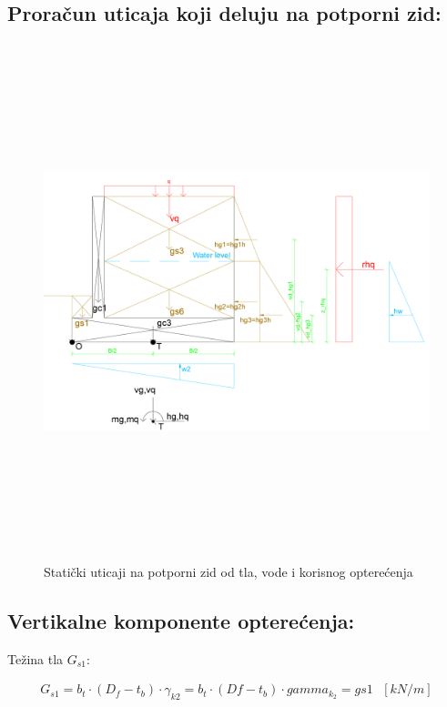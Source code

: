 \documentclass[a4paper, 11pt]{article}
\begin{document}
\subsection*{Prora\v{c}un uticaja koji deluju na potporni zid:}

\begin{figure}[h]
    \centering
    \includegraphics[width=\textwidth, height=15cm]{../Graphics/RetainingWall1_gravity.png}
    \caption{Stati\v{c}ki uticaji na potporni zid od tla, vode i korisnog optere\'cenja}
    \label{uticaji_zida}
\end{figure}


\newpage

\subsection*{Vertikalne komponente optere\'cenja:}

Te\v{z}ina tla $G_{s1}$:

\begin{align*}
G_{s1} = b_{t} \cdot (D_{f} - t_{b}) \cdot \gamma_{k2} = b_t \cdot (Df - t_b) \cdot gamma_k_2 = gs1 \text{ } [kN/m]
\end{align*}
\end{document}
